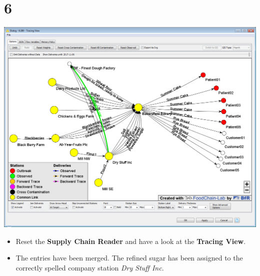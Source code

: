 \documentclass[10pt]{beamer}
\begin{document}
\section{6}
\begin{frame}
	\begin{center}
			\includegraphics[height=0.6\textheight]{6.png}
	\end{center}
	\begin{itemize}
		\item Reset the \textbf{Supply Chain Reader} and have a look at the \textbf{Tracing View}.
		\item The entries have been merged. The refined sugar has been assigned to the correctly spelled company station \textit{Dry Stuff Inc}.
	\end{itemize}
\end{frame}
\end{document}
